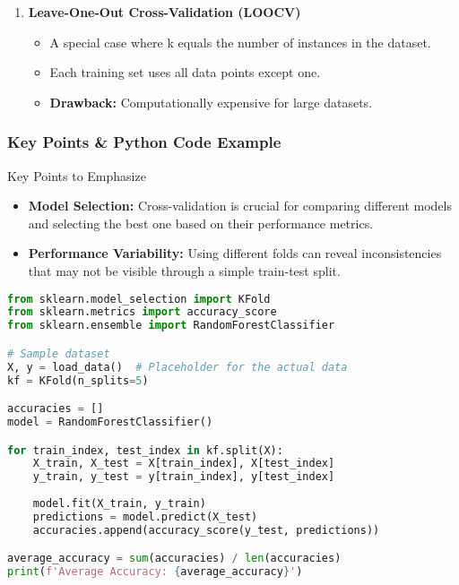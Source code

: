 \documentclass{beamer}
\begin{document}
\begin{frame}[fragile]
\begin{enumerate}
        \item \textbf{Leave-One-Out Cross-Validation (LOOCV)}
            \begin{itemize}
                \item A special case where k equals the number of instances in the dataset.
                \item Each training set uses all data points except one.
                \item \textbf{Drawback:} Computationally expensive for large datasets.
            \end{itemize}
    \end{enumerate}
\end{frame}

\begin{frame}[fragile]
    \frametitle{Key Points & Python Code Example}
    \begin{block}{Key Points to Emphasize}
        \begin{itemize}
            \item \textbf{Model Selection:} Cross-validation is crucial for comparing different models and selecting the best one based on their performance metrics.
            \item \textbf{Performance Variability:} Using different folds can reveal inconsistencies that may not be visible through a simple train-test split.
        \end{itemize}
    \end{block}
    \begin{lstlisting}[language=Python]
from sklearn.model_selection import KFold
from sklearn.metrics import accuracy_score
from sklearn.ensemble import RandomForestClassifier

# Sample dataset
X, y = load_data()  # Placeholder for the actual data
kf = KFold(n_splits=5)

accuracies = []
model = RandomForestClassifier()

for train_index, test_index in kf.split(X):
    X_train, X_test = X[train_index], X[test_index]
    y_train, y_test = y[train_index], y[test_index]
    
    model.fit(X_train, y_train)
    predictions = model.predict(X_test)
    accuracies.append(accuracy_score(y_test, predictions))

average_accuracy = sum(accuracies) / len(accuracies)
print(f'Average Accuracy: {average_accuracy}')
    \end{lstlisting}
\end{frame}
\end{document}
